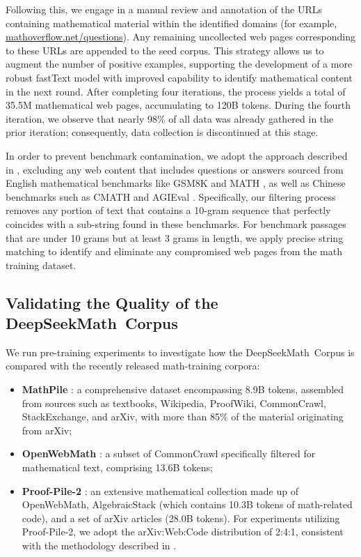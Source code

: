 \begin{itemize}[topsep=0pt]
Following this, we engage in a manual review and annotation of the URLs containing mathematical material within the identified domains (for example, \url{mathoverflow.net/questions}). Any remaining uncollected web pages corresponding to these URLs are appended to the seed corpus. This strategy allows us to augment the number of positive examples, supporting the development of a more robust fastText model with improved capability to identify mathematical content in the next round. After completing four iterations, the process yields a total of 35.5M mathematical web pages, accumulating to 120B tokens. During the fourth iteration, we observe that nearly 98\% of all data was already gathered in the prior iteration; consequently, data collection is discontinued at this stage.

In order to prevent benchmark contamination, we adopt the approach described in \cite{deepseek-coder}, excluding any web content that includes questions or answers sourced from English mathematical benchmarks like GSM8K \citep{gsm8k} and MATH \citep{MATH}, as well as Chinese benchmarks such as CMATH \citep{wei2023cmath} and AGIEval \citep{agieval}. Specifically, our filtering process removes any portion of text that contains a 10-gram sequence that perfectly coincides with a sub-string found in these benchmarks. For benchmark passages that are under 10 grams but at least 3 grams in length, we apply precise string matching to identify and eliminate any compromised web pages from the math training dataset.

\subsection{Validating the Quality of the DeepSeekMath~Corpus}

We run pre-training experiments to investigate how the DeepSeekMath~Corpus is compared with the recently released math-training corpora:

\begin{itemize}[topsep=0pt]
    \item \textbf{MathPile} \citep{mathpile}: a comprehensive dataset encompassing 8.9B tokens, assembled from sources such as textbooks, Wikipedia, ProofWiki, CommonCrawl, StackExchange, and arXiv, with more than 85\% of the material originating from arXiv;
    \item \textbf{OpenWebMath} \citep{openwebmath}: a subset of CommonCrawl specifically filtered for mathematical text, comprising 13.6B tokens;
    \item \textbf{Proof-Pile-2} \citep{llemma}: an extensive mathematical collection made up of OpenWebMath, AlgebraicStack (which contains 10.3B tokens of math-related code), and a set of arXiv articles (28.0B tokens). For experiments utilizing Proof-Pile-2, we adopt the arXiv:Web:Code distribution of 2:4:1, consistent with the methodology described in \cite{llemma}.
\end{itemize}


\end{itemize}
